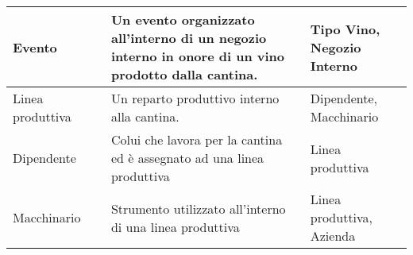 \begin{center}
\begin{longtable}{P{2cm}P{2cm}P{6cm}P{4cm}}
		Evento & & Un evento organizzato all'interno di un negozio interno in onore di un vino prodotto dalla cantina. &  Tipo Vino, Negozio Interno\\

		\midrule
		Linea produttiva & & Un reparto produttivo interno alla cantina. &  Dipendente, Macchinario\\

		\midrule
		Dipendente & & Colui che lavora per la cantina ed è assegnato ad una linea produttiva &  Linea produttiva\\

		\midrule
		Macchinario & & Strumento utilizzato all'interno di una linea produttiva &  Linea produttiva, Azienda\\
		
		\bottomrule
	\end{longtable}
\end{center}